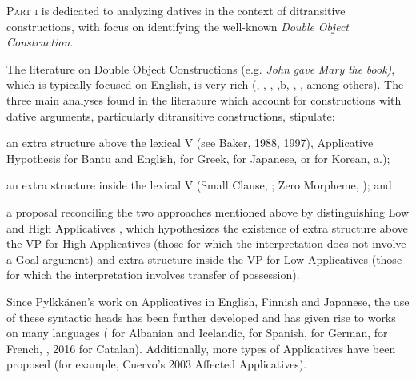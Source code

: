 \begin{styleBodyA}
\textsc{Part} \textsc{i} is dedicated to analyzing datives in the context of ditransitive constructions, with focus on identifying the well-known \textit{Double} \textit{Object} \textit{Construction}. 
\end{styleBodyA}

\begin{styleBodyA}
The literature on Double Object Constructions (e.g. \textit{John} \textit{gave} \textit{Mary} \textit{the} \textit{book)}, which is typically focused on English, is very rich (\citealt{Larson1988}, \citealt{Oehrle1976}, \citealt{Kayne1984}, \citealt{Jackendoff1990a},b, \citealt{Pesetsky1995}, \citealt{Harley2002}, among others). The three main analyses found in the literature which account for constructions with dative arguments, particularly ditransitive constructions, stipulate: 
\end{styleBodyA}

\begin{listWWviiiNumileveli}
\item \begin{styleBodyA}
an extra structure above the lexical V (see Baker, 1988, 1997),  Applicative Hypothesis for Bantu and English, \citet{Anagnostopoulou2003} for Greek, \citet{MiyagawaTsujioka2004} for Japanese, or \citet{MiyagawaJung2004} for Korean, a.); 
\end{styleBodyA}
\item \begin{styleBodyA}
 an extra structure inside the lexical V (Small Clause, \citealt{Kayne1984}; Zero Morpheme, \citealt{Pesetsky1995}); and
\end{styleBodyA}
\item \begin{styleBodyA}
a proposal reconciling the two approaches mentioned above by distinguishing Low and High Applicatives \citep{Pylkkänen2002}, which hypothesizes the existence of extra structure above the VP for High Applicatives (those for which the interpretation does not involve a Goal argument) and extra structure inside the VP for Low Applicatives (those for which the interpretation involves transfer of possession). 
\end{styleBodyA}
\end{listWWviiiNumileveli}
\begin{stylePrrafodelista}
\textmd{Since Pylkkänen's work on Applicatives in English, Finnish and Japanese, the use of these syntactic heads has been further developed and has given rise to works on many languages (\citealt{McGinnis2001} for Albanian and Icelandic, \citealt{Cuervo2003} for Spanish, \citealt{McIntyre2006} for German, \citealt{Fournier2010} for French, \citealt{Pineda2013}, 2016 for Catalan). Additionally, more types of Applicatives have been proposed (for example, Cuervo’s 2003 Affected Applicatives).~}
\end{stylePrrafodelista}


